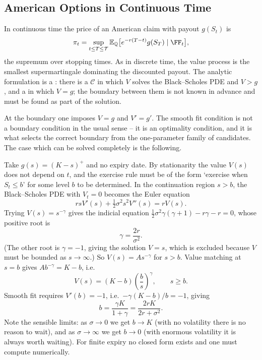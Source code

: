 \documentclass[a4paper]{scrartcl}
\newcommand{\QQ}{\mathbb{Q}}
\begin{document}
\subsection{American Options in Continuous Time}

In continuous time the price of an American claim with payout $g(S_t)$ is
$$
\pi_t = \sup_{t\leq T\leq \mathcal{T}}\EE_\QQ\big[e^{-r(T-t)}g(S_T)\mid\FF_t\big],
$$
the supremum over stopping times. As in discrete time, the value process is the smallest supermartingale dominating the discounted payout. The analytic formulation is a : there is a  $\mathcal{C}$ in which $V$ solves the Black--Scholes PDE and $V > g$, and a  in which $V = g$; the boundary between them is not known in advance and must be found as part of the solution.

At the boundary one imposes  $V = g$ and  $V' = g'$. The smooth fit condition is not a boundary condition in the usual sense -- it is an optimality condition, and it is what selects the correct boundary from the one-parameter family of candidates. The case which can be solved completely is the following.

\begin{example}
	Take $g(s) = (K-s)^+$ and no expiry date. By stationarity the value $V(s)$ does not depend on $t$, and the exercise rule must be of the form `exercise when $S_t \leq b$' for some level $b$ to be determined. In the continuation region $s > b$, the Black--Scholes PDE with $V_t = 0$ becomes the Euler equation
	$$
	rsV'(s) + \tfrac12\sigma^2s^2V''(s) = rV(s).
	$$
	Trying $V(s) = s^{-\gamma}$ gives the indicial equation $\tfrac12\sigma^2\gamma(\gamma+1) - r\gamma - r = 0$, whose positive root is
	$$
	\gamma = \frac{2r}{\sigma^2}.
	$$
	(The other root is $\gamma = -1$, giving the solution $V = s$, which is excluded because $V$ must be bounded as $s\to\infty$.) So $V(s) = A s^{-\gamma}$ for $s > b$. Value matching at $s = b$ gives $Ab^{-\gamma} = K - b$, i.e.
	$$
	V(s) = (K-b)\left(\frac{b}{s}\right)^{\gamma}, \qquad s \geq b.
	$$
	Smooth fit requires $V'(b) = -1$, i.e.\ $-\gamma(K-b)/b = -1$, giving
	$$
	b = \frac{\gamma K}{1+\gamma} = \frac{2rK}{2r+\sigma^2}.
	$$
	Note the sensible limits: as $\sigma\to0$ we get $b \to K$ (with no volatility there is no reason to wait), and as $\sigma\to\infty$ we get $b\to0$ (with enormous volatility it is always worth waiting). For finite expiry no closed form exists and one must compute numerically.
\end{example}
\end{document}
